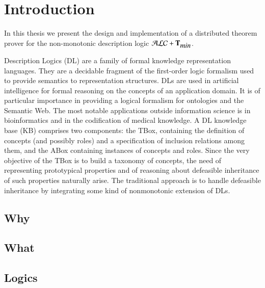 \documentclass[a4paper, 11pt, oneside]{elsarticle}
\newcommand{\tip}{{\bf T}}
\newcommand{\alctmin}{\mathcal{ALC}+\tip_{\mbox{\em min}}}
\begin{document}
\newpage





\chapter{Introduction}

In this thesis we present the design and implementation of a distributed theorem prover for the non-monotonic description logic $\alctmin$.

Description Logics (DL) are a family of formal knowledge representation languages. They are a decidable fragment of the first-order logic formalism used to provide semantics to representation structures.
DLs are used in artificial intelligence for formal reasoning on the concepts of an application domain. It is of particular importance in providing a logical formalism for ontologies and the Semantic Web. The most notable applications outside information science is in bioinformatics and in the codification of medical knowledge. A DL knowledge base (KB) comprises two components: the TBox, containing the definition of concepts (and possibly roles) and a specification of inclusion relations among them, and the ABox containing instances of concepts and roles. Since the very objective of the TBox is to build a taxonomy of concepts, the need of representing prototypical properties and of reasoning about defeasible inheritance of such properties naturally arise. The traditional approach is to handle defeasible inheritance by integrating some kind of nonmonotonic extension of DLs.


\section{Why}
\section{What}
\section{Logics}
\end{document}
